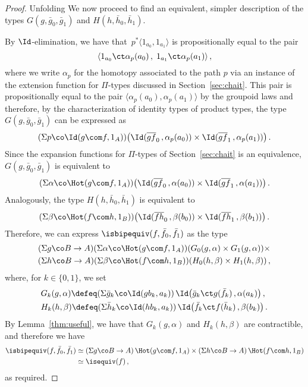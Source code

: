 
\newpage

\begin{proof}
Unfolding We now proceed to find an equivalent, simpler description of the types $G(g, \bar{g}_0, \bar{g}_1)$ and $H(h, \bar{h}_0, \bar{h}_1)$.  


 By $\Id$-elimination, 
we have that~$p^* \langle 1_{a_0}, 1_{a_1} \rangle$ is  propositionally equal to the pair 
\[
\langle 1_{a_0} \ct \alpha_p(a_0)  \, , \;   1_{a_1} \ct \alpha_p(a_1)  \rangle \, , 
\]
where we write $\alpha_p$ for the homotopy associated to the path $p$ via an instance of
the extension function for $\Pi$-types discussed in Section~\eqref{sec:chait}. This pair is propositionally equal 
to the pair $\langle  \alpha_p(a_0), \alpha_p(a_1) \rangle$ by the groupoid laws and 
 therefore, by the characterization of identity types of product types, 
 the type $G(g,\bar{g}_0,\bar{g}_1)$ can be expressed as
\[
(\Sigma p \co \Id( g \com f, 1_A))
\big(
\Id(  
\overline{gf}_0 \, ,  \alpha_p(a_0)) 
\times 
\Id( \overline{gf}_1 \, ,  \alpha_p(a_1))
\big) \, .
\]
Since the expansion functions for $\Pi$-types of Section~\ref{sec:chait} is an equivalence, $G(g, \bar{g}_0, \bar{g}_1)$ is equivalent to
\begin{align*}
(\Sigma \alpha \co \Hot( g \com f, 1_A))
\big( \Id  ( \overline{gf}_0 \, ,  \alpha(a_0) ) 
\times 
\Id ( \overline{gf}_1 \, ,  \alpha(a_1) ) 
\big) \, .
\end{align*}
Analogously, the type $H(h,\bar{h}_0,\bar{h}_1)$ is equivalent to
\[
(\Sigma \beta \co \Hot(f \com h, 1_B))
\big(
\Id  (  \overline{fh}_0 \, ,  \beta(b_0) ) 
\times 
\Id(  \overline{fh}_1 \, ,  \beta(b_1))
\big) \, .
\]
Therefore, we can express $\isbipequiv(f, \bar{f}_0, \bar{f}_1)$ as the type
\begin{multline*} 
(\Sigma g \co B \to  A)
(\Sigma \alpha \co \Hot(g \com f,  1_A))( G_0(g,\alpha) \times G_1(g,\alpha)) \times \\
(\Sigma h \co B \to A)
(\Sigma \beta \co\Hot( f \com h, 1_B)) (H_0(h,\beta) \times H_1(h,\beta)) \, ,
\end{multline*} 
where, for $k \in \{ 0,1 \}$, we set
\begin{align*}
& G_k(g,\alpha) \defeq 
(\Sigma \bar{g}_k \co \Id( g b_k,  a_k))  \, \Id \big( \bar{g}_k \ct g (\bar{f}_k)  \, ,  \alpha(a_k) \big) \, , \\
& H_k(h,\beta) \defeq (\Sigma \bar{h}_k \co \Id( h b_k , a_k)) \, \Id \big(\bar{f}_k \ct f (\bar{h}_k)  \, ,  \beta(b_k) \big)  \, .
\end{align*}
By Lemma~\ref{thm:useful}, we have that $G_k(g,\alpha)$ and
 $H_k(h,\beta)$ are contractible, and therefore we have 
\begin{align*} 
\isbipequiv(f,\bar{f}_0, \bar{f}_1) 
  & \simeq  (\Sigma g \co B \to A)  \, \Hot( g \com f , 1_A ) \times 
(\Sigma h  \co B \to A) \,  \Hot( f \com h, 1_B ) \\
 & \simeq \isequiv(f) \, ,
\end{align*} 
as required.
\end{proof}

